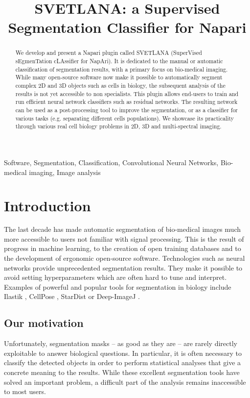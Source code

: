 \documentclass{article}
\title{SVETLANA: a Supervised Segmentation Classifier for Napari}
\begin{document}
%
\maketitle
%
\begin{abstract}
We develop and present a Napari plugin called SVETLANA (SuperVised sEgmenTation cLAssifier for NapAri). It is dedicated to the manual or automatic classification of segmentation results, with a primary focus on bio-medical imaging.
While many open-source software now make it possible to automatically segment complex 2D and 3D objects such as cells in biology, the subsequent analysis of the results is not yet accessible to non specialists. 
This plugin allows end-users to train and run efficient neural network classifiers such as residual networks. 
The resulting network can be used as a post-processing tool to improve the segmentation, or as a classifier for various tasks (e.g. separating different cells populations).
We showcase its practicality through various real cell biology problems in 2D, 3D and multi-spectral imaging.
\end{abstract}
%
\begin{keywords}
Software, Segmentation, Classification, Convolutional Neural Networks, Bio-medical imaging, Image analysis
\end{keywords}
%
\section{Introduction}
\label{sec:intro}

The last decade has made automatic segmentation of bio-medical images much more accessible to users not familiar with signal processing. 
This is the result of progress in machine learning, to the creation of open training databases and to the development of ergonomic open-source software. Technologies such as neural networks provide unprecedented segmentation results. They make it possible to avoid setting hyperparameters which are often hard to tune and interpret. 
Examples of powerful and popular tools for segmentation in biology include Ilastik \cite{berg2019ilastik}, CellPose \cite{stringer2021cellpose}, StarDist \cite{fazeli2020automated} or Deep-ImageJ \cite{gomez2021deepimagej}. 

\subsection{Our motivation}

Unfortunately, segmentation masks -- as good as they are -- are rarely directly exploitable to answer biological questions. In particular, it is often necessary to classify the detected objects in order to perform statistical analyses that give a concrete meaning to the results. 
While these excellent segmentation tools have solved an important problem, a difficult part of the analysis remains inaccessible to most users.
\end{document}
